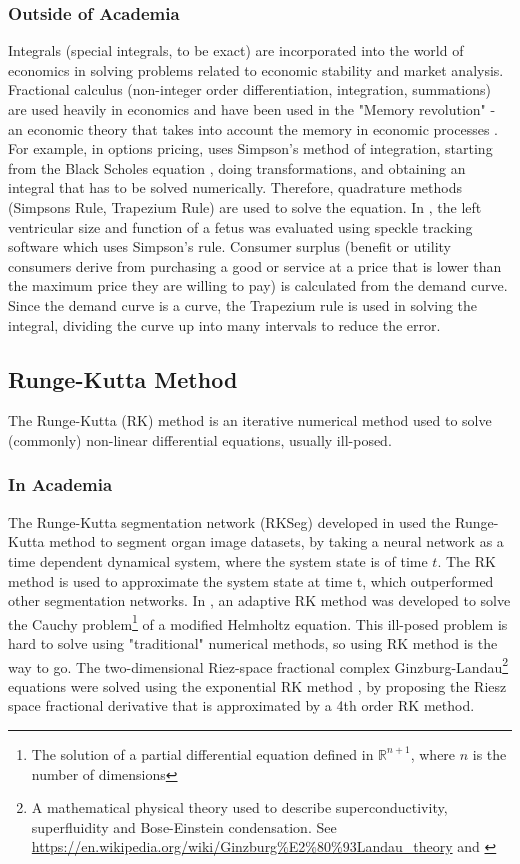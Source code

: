 \documentclass[a4paper, 10pt, conference]{ieeeconf}      %
\begin{document}
\subsubsection{Outside of Academia}
Integrals (special integrals, to be exact) are incorporated into the world of economics \cite{Sherdor2023} in solving problems related to economic stability and market analysis. Fractional calculus (non-integer order differentiation, integration, summations) \cite{Ross1977} are used heavily in economics and have been used in the "Memory revolution" - an economic theory that takes into account the memory in economic processes \cite{Tarasov2019}. For example, in options pricing, \cite{andricopoulos2003universal} uses Simpson's method of integration, starting from the Black Scholes equation \cite{black1973pricing}, doing transformations, and obtaining an integral that has to be solved numerically. Therefore, quadrature methods (Simpsons Rule, Trapezium Rule) are used to solve the equation. In \cite{devore2019evaluation}, the left ventricular size and function of a fetus was evaluated using speckle tracking software \cite{kremkau2015general} which uses Simpson's rule. Consumer surplus (benefit or utility consumers derive from purchasing a good or service at a price that is lower than the maximum price they are willing to pay) is calculated from the demand curve. Since the demand curve is a curve, the Trapezium rule is used in solving the integral, dividing the curve up into many intervals to reduce the error.

\subsection{Runge-Kutta Method} %
The Runge-Kutta (RK) method is an iterative numerical method used to solve (commonly) non-linear differential equations, usually ill-posed. 

\subsubsection{In Academia} %
The Runge-Kutta segmentation network (RKSeg) developed in \cite{Zhu2023} used the Runge-Kutta method to segment organ image datasets, by taking a neural network as a time dependent dynamical system, where the system state is of time $t$. The RK method is used to approximate the system state at time t, which outperformed other segmentation networks. In \cite{Jday2023}, an adaptive RK method was developed to solve the Cauchy problem\footnote{The solution of a partial differential equation defined in $\mathbb{R}^{n+1}$, where $n$ is the number of dimensions} of a modified Helmholtz equation. This ill-posed problem is hard to solve using "traditional" numerical methods, so using RK method is the way to go. The two-dimensional Riez-space fractional complex Ginzburg-Landau\footnote{A mathematical physical theory used to describe superconductivity, superfluidity and Bose-Einstein condensation. See \url{https://en.wikipedia.org/wiki/Ginzburg\%E2\%80\%93Landau_theory} and \cite{Aranson2002}} equations \cite{Wang2018} were solved using the exponential RK method \cite{Hochbruck2005, Hochbruck2010}, by proposing the Riesz space fractional derivative that is approximated by a 4th order RK method.
\end{document}
